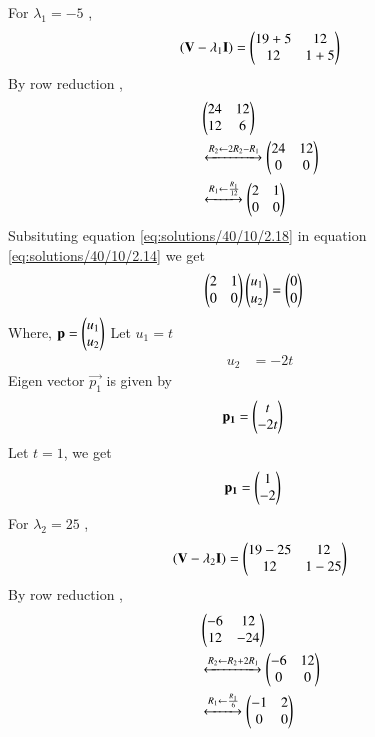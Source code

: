 For $\lambda_1=-5$ ,
\begin{align}
    (\mathbf{V}-\lambda_1\mathbf{I})=\begin{pmatrix}19+5 & 12 \\12 & 1+5\end{pmatrix}
\end{align}
By row reduction , 
\begin{align}
    &\begin{pmatrix}24 & 12 \\12 & 6\end{pmatrix}\\
&\xleftrightarrow{R_2\leftarrow 2R_2 -R_1}
    \begin{pmatrix}24 & 12 \\ 0& 0\end{pmatrix}\\
        &\xleftrightarrow{R_1\leftarrow \frac{R_1}{12}}
    \begin{pmatrix}2 & 1 \\ 0& 0\end{pmatrix}
    \label{eq:solutions/40/10/2.18}
\end{align}
Subsituting equation \ref{eq:solutions/40/10/2.18} in equation \ref{eq:solutions/40/10/2.14} we get
\begin{align}
        &   \begin{pmatrix}2 & 1 \\ 0& 0\end{pmatrix}\begin{pmatrix}u_1 \\ u_2\end{pmatrix}=\begin{pmatrix}0 \\ 0\end{pmatrix}\label{eq:solutions/40/10/2.19}
\end{align}
Where, $\mathbf{p}=\begin{pmatrix}u_1\\u_2\end{pmatrix}$
Let $u_1=t$
\begin{align}
    u_2&=-2t
\end{align}
Eigen vector $\vec{p_1}$ is given by
\begin{align}
    \mathbf{p_1}&=\begin{pmatrix}t \\ -2t\end{pmatrix}
\end{align}
Let $t=1$, we get
\begin{align}
        \mathbf{p_1}&=\begin{pmatrix}1 \\-2 \end{pmatrix}\label{eq:solutions/40/10/2.22}
\end{align}
For $\lambda_2=25$ ,
\begin{align}
    (\mathbf{V}-\lambda_2\mathbf{I})=\begin{pmatrix}19-25 & 12 \\12 & 1-25\end{pmatrix}
\end{align}
By row reduction , 
\begin{align}
    &\begin{pmatrix}-6 & 12 \\12 & -24\end{pmatrix}\\
&\xleftrightarrow{R_2\leftarrow R_2 +2R_1}
    \begin{pmatrix}-6 & 12 \\ 0& 0\end{pmatrix}\\
        &\xleftrightarrow{R_1\leftarrow \frac{R_1}{6}}
    \begin{pmatrix}-1 & 2 \\ 0& 0\end{pmatrix}
    \label{eq:solutions/40/10/2.26}
\end{align}
